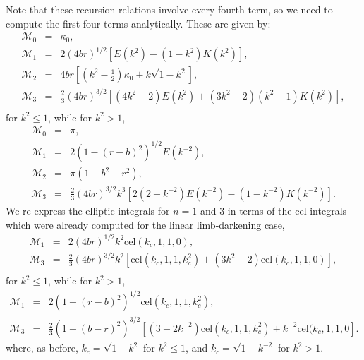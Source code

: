 \documentclass[modern]{aastex61}
\begin{document}
Note that these recursion relations involve every fourth term, so we need to compute
the first four terms analytically.  These are given by:
\begin{eqnarray}
\mathcal{M}_0 &=& \kappa_0,\\
\mathcal{M}_1 &=& 2 (4br)^{1/2} \left[E(k^2)-(1-k^2)K(k^2)\right],\\
\mathcal{M}_2 &=& 4br\left[(k^2-\tfrac{1}{2}) \kappa_0 + k\sqrt{1-k^2}\right],\\
\mathcal{M}_3 &=& \tfrac{2}{3}(4br)^{3/2} \left[(4k^2-2)E(k^2)+(3k^2-2)(k^2-1)K(k^2)\right],\\
\end{eqnarray}
for $k^2 \le 1$, while for $k^2 > 1$,
\begin{eqnarray}
\mathcal{M}_0 &=& \pi,\\
\mathcal{M}_1 &=& 2(1-(r-b)^2)^{1/2}E(k^{-2}),\\
\mathcal{M}_2 &=& \pi(1-b^2-r^2),\\
\mathcal{M}_3 &=& \tfrac{2}{3}(4br)^{3/2} k^3\left[2(2-k^{-2})E(k^{-2})-(1-k^{-2})K(k^{-2})\right].
\end{eqnarray}
We re-express the elliptic integrals for $n=1$ and $3$ in terms of the cel integrals which
were already computed for the linear limb-darkening case,
\begin{eqnarray}
\mathcal{M}_1 &=& 2 (4br)^{1/2} k^2 \mathrm{cel}(k_c,1,1,0),\\
\mathcal{M}_3 &=& \tfrac{2}{3}(4br)^{3/2}k^2 \left[ \mathrm{cel}(k_c,1,1,k_c^2)+(3k^2-2) \mathrm{cel}(k_c,1,1,0)\right],\\
\end{eqnarray}
for $k^2 \le 1$, while for $k^2 > 1$,
\begin{eqnarray}
\mathcal{M}_1 &=& 2(1-(r-b)^2)^{1/2} \mathrm{cel}(k_c,1,1,k_c^2),\\
\mathcal{M}_3 &=& \tfrac{2}{3}(1-(b-r)^2)^{3/2} \left[(3-2k^{-2}) \mathrm{cel}(k_c,1,1,k_c^2)+k^{-2} \mathrm{cel}(k_c,1,1,0\right].
\end{eqnarray}
where, as before, $k_c = \sqrt{1-k^2}$ for $k^2 \le 1$, and $k_c = \sqrt{1-k^{-2}}$ for $k^2 > 1$.
\end{document}
